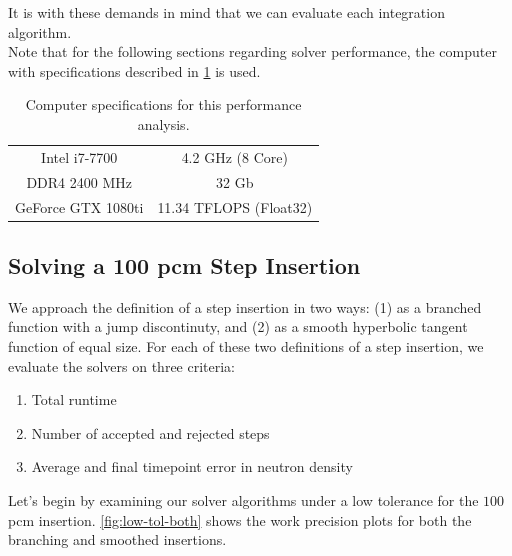 \documentclass[review,onefignum,onetabnum]{siamart171218}
\begin{document}
It is with these demands in mind that we can evaluate each integration algorithm.\\

Note that for the following sections regarding solver performance, the computer
with specifications described in \cref{tab:computer-specs} is used.

\begin{table}[htb]
  \begin{center}
    \begin{tabular}{c|c}
      Intel i7-7700&4.2 GHz (8 Core)\\
      DDR4 2400 MHz&32 Gb\\
      GeForce GTX 1080ti&11.34 TFLOPS (Float32)\\
    \end{tabular}
  \end{center}
  \caption{Computer specifications for this performance analysis.}
  \label{tab:computer-specs}
\end{table}

\subsection{Solving a 100 pcm Step Insertion}

We approach the definition of a step insertion in two ways: (1) as a branched
function with a jump discontinuty, and (2) as a smooth hyperbolic tangent function
of equal size. For each of these two definitions of a step insertion, we
evaluate the solvers on three criteria: \\


\begin{enumerate}
  \item Total runtime
  \item Number of accepted and rejected steps
  \item Average and final timepoint error in neutron density\\
\end{enumerate}


Let's begin by examining our solver algorithms under a low tolerance for the $100$
pcm insertion. \cref{fig:low-tol-both} shows the work precision plots for
both the branching and smoothed insertions.
\end{document}
